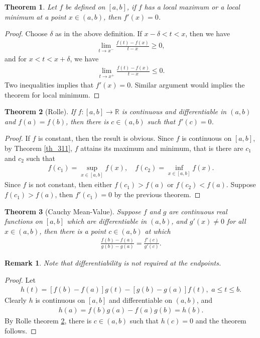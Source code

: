 \documentclass[11pt]{book}
\newtheorem{theorem}{Theorem}[chapter]
\newtheorem{remark}{Remark}[chapter]
\theoremstyle{definition}
\numberwithin{equation}{chapter}
\begin{document}
\begin{theorem}\label{th_45}
Let $f$ be defined on $[a,b]$, if $f$ has a local maximum or a local minimum at a point $x \in (a,b)$, then $f'(x) = 0$.
\end{theorem}
\begin{proof}
Choose $\delta$ as in the above definition. If $x - \delta < t < x$, then we have
\begin{align*}
    \lim_{t\to x^-}\frac{f(t) - f(x)}{t - x} \geq 0,
\end{align*}
and for $x < t < x + \delta$, we have
\begin{align*}
    \lim_{t\to x^+}\frac{f(t) - f(x)}{t - x} \leq 0.
\end{align*}
Two inequalities implies that $f'(x) = 0$. Similar argument would implies the theorem for local minimum.
\end{proof}

\medskip

\begin{theorem}[Rolle]\label{th_46}
If $f: [a,b] \to \mathbb{R}$ is continuous and differentiable in $(a,b)$ and $f(a) = f(b)$, then there is $c \in (a,b)$ such that $f'(c) = 0$.
\end{theorem}
\begin{proof}
If $f$ is constant, then the result is obvious. Since $f$ is continuous on $[a,b]$, by Theorem \ref{th_311}, $f$ attains its maximum and minimum, that is there are $c_1$ and $c_2$ such that
\begin{align*}
    f(c_1) = \sup_{x\in[a,b]} f(x), \quad f(c_2) = \inf_{x\in[a,b]} f(x).
\end{align*}
Since $f$ is not constant, then either $f(c_1) > f(a)$ or $f(c_2) < f(a)$. Suppose $f(c_1) > f(a)$, then $f'(c_1) = 0$ by the previous theorem.
\end{proof}

\medskip

\begin{theorem}[Cauchy Mean-Value]\label{th_47}
Suppose $f$ and $g$ are continuous real functions on $[a,b]$ which are differentiable in $(a,b)$, and $g'(x) \neq 0$ for all $x \in (a,b)$, then there is a point $c \in (a,b)$ at which 
\begin{align*}
    \frac{f(b) - f(a)}{g(b) - g(a)} = \frac{f'(c)}{g'(c)}.
\end{align*}
\end{theorem}
\begin{remark}
Note that differentiability is not required at the endpoints.
\end{remark}
\begin{proof}
Let
\begin{align*}
    h(t) = [f(b) - f(a)]g(t) - [g(b) - g(a)]f(t), \,\, a \leq t \leq b.
\end{align*}
Clearly $h$ is continuous on $[a,b]$ and differentiable on $(a,b)$, and
\begin{align*}
    h(a) = f(b)g(a) - f(a)g(b) = h(b).
\end{align*}
By Rolle theorem \ref{th_46}, there is $c \in (a,b)$ such that $h(c) = 0$ and the theorem follows.
\end{proof}
\end{document}
